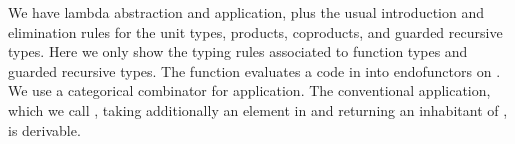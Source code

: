 \begin{AgdaAlign}
We have lambda abstraction and application, plus the usual
introduction and elimination rules for the unit types, products, 
coproducts, and guarded recursive types. Here we only show the typing rules associated to function types and guarded recursive types.
The function  evaluates a code in   into endofunctors on  .
We use a categorical combinator  for application.
The conventional application, which we call \F{\$}, taking additionally an element
in    and returning an inhabitant of   , is derivable.
\begin{code}%
%
\>[4]\AgdaSpace{}%
\AgdaSymbol{:}\AgdaSpace{}%
\AgdaSpace{}%
\AgdaSymbol{\{}\AgdaSymbol{\}}\AgdaSpace{}%
\AgdaSymbol{\{}\AgdaSpace{}%
\AgdaSymbol{:}\AgdaSpace{}%
\AgdaSpace{}%
\AgdaSymbol{\}}\AgdaSpace{}%
\AgdaSymbol{\{}\AgdaSpace{}%
\AgdaSpace{}%
\AgdaSymbol{:}\AgdaSpace{}%
\AgdaSpace{}%
\AgdaSymbol{\}}\AgdaSpace{}%
\AgdaSpace{}%
\AgdaSpace{}%
\AgdaSymbol{(}\AgdaSpace{}%
\AgdaOperator{\AgdaInductiveConstructor{,}}\AgdaSpace{}%
\AgdaSymbol{)}\AgdaSpace{}%
\AgdaSpace{}%
\AgdaSpace{}%
\AgdaSpace{}%
\AgdaSpace{}%
\AgdaSymbol{(}\AgdaSpace{}%
\AgdaSpace{}%
\AgdaSymbol{)}\<%
\\
%
\>[4]\AgdaSpace{}%
\AgdaSymbol{:}\AgdaSpace{}%
\AgdaSpace{}%
\AgdaSymbol{\{}\AgdaSymbol{\}}\AgdaSpace{}%
\AgdaSymbol{\{}\AgdaSpace{}%
\AgdaSymbol{:}\AgdaSpace{}%
\AgdaSpace{}%
\AgdaSymbol{\}}\AgdaSpace{}%
\AgdaSymbol{\{}\AgdaSpace{}%
\AgdaSpace{}%
\AgdaSymbol{:}\AgdaSpace{}%
\AgdaSpace{}%
\AgdaSymbol{\}}\AgdaSpace{}%
\AgdaSpace{}%
\AgdaSpace{}%
\AgdaSpace{}%
\AgdaSymbol{(}\AgdaSpace{}%
\AgdaSpace{}%
\AgdaSymbol{)}\AgdaSpace{}%
\AgdaSpace{}%
\AgdaSpace{}%
\AgdaSymbol{(}\AgdaSpace{}%
\AgdaOperator{\AgdaInductiveConstructor{,}}\AgdaSpace{}%
\AgdaSymbol{)}\AgdaSpace{}%
\<%
\\
%
\>[4]\AgdaSpace{}%

\end{code}
\end{AgdaAlign}
